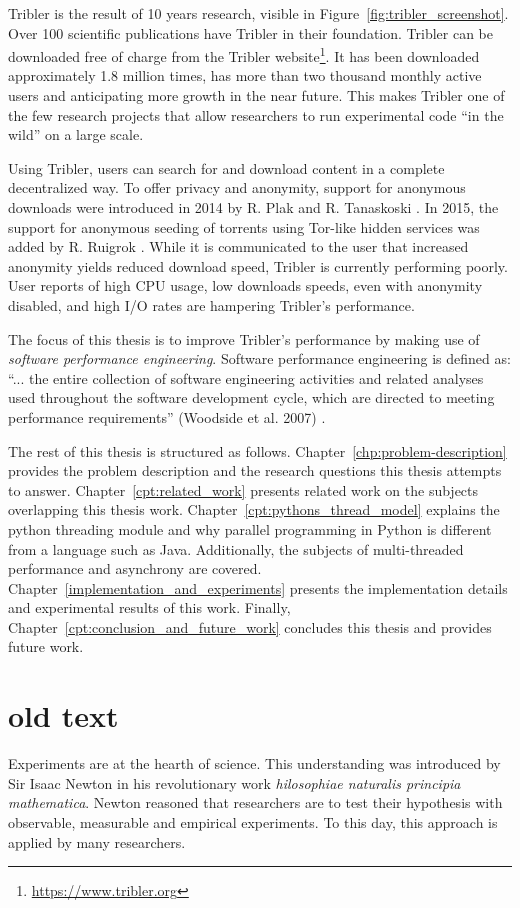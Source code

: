Tribler is the result of 10 years research, visible in Figure~\ref{fig:tribler_screenshot}.
Over 100 scientific publications have Tribler in their foundation.
Tribler can be downloaded free of charge from the Tribler website\footnote{\url{https://www.tribler.org}}.
It has been downloaded approximately 1.8 million times, has more than two thousand  monthly active users and anticipating more growth in the near future.
This makes Tribler one of the few research projects that allow researchers to run experimental code \enquote{in the wild} on a large scale.

Using Tribler, users can search for and download content in a complete decentralized way.
To offer privacy and anonymity, support for anonymous downloads were introduced in 2014 by R. Plak \cite{plak2014anonymous} and R. Tanaskoski \cite{tanaskoski2014anonymous}.
In 2015, the support for anonymous seeding of torrents using Tor-like hidden services was added by R. Ruigrok \cite{ruigrok2015bittorrent}.
While it is communicated to the user that increased anonymity yields reduced download speed, Tribler is currently performing poorly.
User reports of high CPU usage, low downloads speeds, even with anonymity disabled, and high I/O rates are hampering Tribler's performance. 

The focus of this thesis is to improve Tribler's performance by making use of \emph{software performance engineering}.
Software performance engineering is defined as: \enquote{... the entire collection of software engineering activities and related analyses used throughout the software development cycle, which are directed to meeting performance requirements} (Woodside et al. 2007) \cite{woodside2007future}.

The rest of this thesis is structured as follows.
Chapter~\ref{chp:problem-description} provides the problem description and the research questions this thesis attempts to answer.
Chapter~\ref{cpt:related_work} presents related work on the subjects overlapping this thesis work.
Chapter~\ref{cpt:pythons_thread_model} explains the python threading module and why parallel programming in Python is different from a language such as Java. Additionally, the subjects of multi-threaded performance and asynchrony are covered.
Chapter~\ref{implementation_and_experiments} presents the implementation details and experimental results of this work.
Finally, Chapter~\ref{cpt:conclusion_and_future_work} concludes this thesis and provides future work.

\section{old text}
Experiments are at the hearth of science.
This understanding was introduced by Sir Isaac Newton in his revolutionary work \emph{hilosophiae naturalis principia mathematica}.
Newton reasoned that researchers are to test their hypothesis with observable, measurable and empirical experiments.
To this day, this approach is applied by many researchers.

